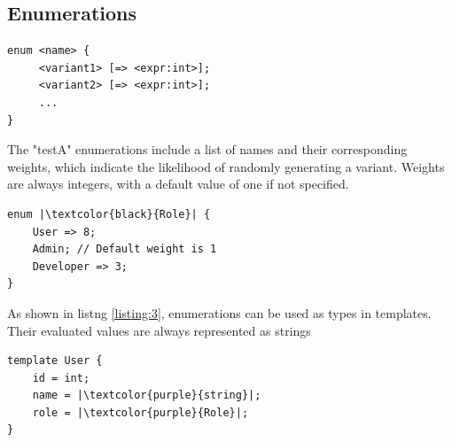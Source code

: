 \documentclass[11pt,a4paper]{article}
\begin{document}
    \subsection{Enumerations}
    \begin{listing}[h]
        \begin{verbatim}
enum <name> { 
     <variant1> [=> <expr:int>]; 
     <variant2> [=> <expr:int>]; 
     ... 
}  
        \end{verbatim}
        \caption{Enumeration declaration}
        \centering
        \label{declaration:enum}
    \end{listing}
    \par The "testA" enumerations include a list of names and their corresponding weights, which indicate the likelihood of randomly generating a variant. 
    Weights are always integers, with a default value of one if not specified.
    \begin{listing}[h]
        \begin{verbatim}
enum |\textcolor{black}{Role}| {
    User => 8;
    Admin; // Default weight is 1
    Developer => 3;
}
        \end{verbatim}
        \caption{Enumerations in testA}
        \centering
        \label{listing:2}
    \end{listing}
    \par As shown in listng \ref{listing:3}, enumerations can be used as types in templates. Their evaluated values are always represented as strings
    \begin{listing}[h]
        \begin{verbatim}
template User {
    id = int;
    name = |\textcolor{purple}{string}|;
    role = |\textcolor{purple}{Role}|;
}
        \end{verbatim}
        \caption{Template with enumeration field}
        \centering
        \label{listing:3}
    \end{listing}
    \pagebreak
\end{document}
